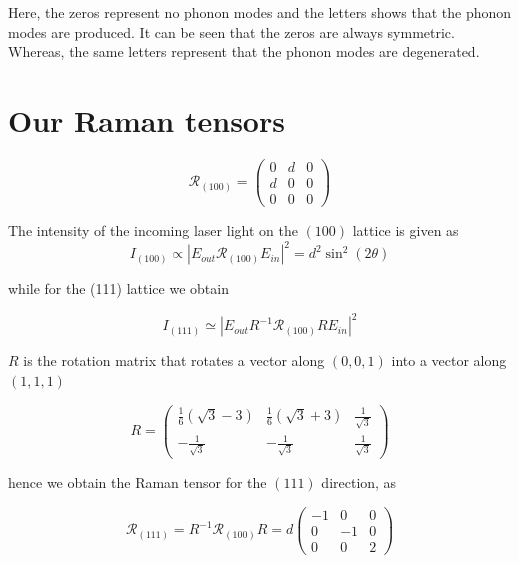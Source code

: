 \documentclass[openany,11pt,a4paper]{report}
\begin{document}
Here, the zeros represent no phonon modes and the letters shows that the phonon modes are produced. It can be seen that the zeros are always symmetric. Whereas, the same letters represent that the phonon modes are degenerated. \cite{bib1}


\newpage

\section*{Our Raman tensors}

\begin{equation}
\mathcal{R}_{(100)}=\left(\begin{array}{ccc}{0} & {d} & {0} \\ {d} & {0} & {0} \\ {0} & {0} & {0}\end{array}\right)
\end{equation}




The intensity of the incoming laser light on the $(100)$ lattice is given as
\begin{equation}
I_{(100)} \propto\left|E_{o u t} \mathcal{R}_{(100)} E_{i n}\right|^{2}=d^{2} \sin ^{2}(2 \theta)
\end{equation}

while for the (111) lattice we obtain 

\begin{equation}
 I_{(111)} \simeq \left|E_{o u t} R^{-1} \mathcal{R}_{(100)} R E_{i n}\right|^{2}
\end{equation}


$R$ is the rotation matrix that rotates a vector along $(0,0,1)$ into a vector along
$(1,1,1)$ 

\begin{equation}
R=\left(\begin{array}{ccc}{\frac{1}{6}(\sqrt{3}-3)} & {\frac{1}{6}(\sqrt{3}+3)} & {\frac{1}{\sqrt{3}}} \\ {-\frac{1}{\sqrt{3}}} & {-\frac{1}{\sqrt{3}}} & {\frac{1}{\sqrt{3}}}\end{array}\right)
\end{equation}


hence we obtain the Raman tensor for the $(111)$ direction, as

\begin{equation}
\mathcal{R}_{(111)}=R^{-1} \mathcal{R}_{(100)} R=d\left(\begin{array}{ccc}{-1} & {0} & {0} \\ {0} & {-1} & {0} \\ {0} & {0} & {2}\end{array}\right)
\end{equation}
\end{document}
